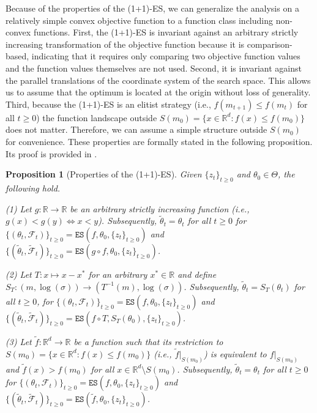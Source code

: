\documentclass[journal]{IEEEtran}
\providecommand{\R}{\mathbb{R}} %
\renewcommand{\geq}{\geqslant} %
\renewcommand{\leq}{\leqslant} %
\newtheorem{proposition}[theorem]{Proposition}
\theoremstyle{definition}
\begin{document}
Because of the properties of the (1+1)-ES, we can generalize the analysis on a relatively simple convex objective function to a function class including non-convex functions.
First, the (1+1)-ES is invariant against an arbitrary strictly increasing transformation of the objective function because it is comparison-based, indicating that it requires only comparing two objective function values and the function values themselves are not used. 
Second, it is invariant against the parallel translations of the coordinate system of the search space. This allows us to assume that the optimum is located at the origin without loss of generality.
Third, because the (1+1)-ES is an elitist strategy (i.e., $f(m_{t+1}) \leq f(m_t)$ for all $t \geq 0$) the function landscape outside $S(m_0) = \{x \in \R^d : f(x) \leq f(m_0)\}$ does not matter. 
Therefore, we can assume a simple structure outside $S(m_0)$ for convenience.
These properties are formally stated in the following proposition. 
Its proof is provided in .


\begin{proposition}[Properties of the (1+1)-ES]\label{prop:invariance}
Given $\{z_t\}_{t \geq 0}$ and $\theta_0 \in \Theta$, the following hold.

(1) Let $g:\R \to \R$ be an arbitrary strictly increasing function (i.e., $g(x) < g(y) \Leftrightarrow x < y$). Subsequently, $\tilde{\theta}_t = \theta_t$ for all $t \geq 0$ for $\{(\theta_t, \mathcal{F}_{t})\}_{t\geq 0} = \texttt{ES}(f, \theta_0, \{z_t\}_{t \geq 0})$ and $\{(\tilde{\theta}_t, \tilde{\mathcal{F}}_{t})\}_{t\geq 0} = \texttt{ES}(g \circ f, \theta_0, \{z_t\}_{t \geq 0})$.

(2) Let $T: x \mapsto x - x^*$ for an arbitrary $x^* \in \R$ and define $S_T: (m, \log(\sigma)) \to (T^{-1}(m), \log(\sigma))$. Subsequently, $\tilde{\theta}_t = S_T(\theta_t)$ for all $t \geq 0$,
for $\{(\theta_t, \mathcal{F}_{t})\}_{t\geq 0} = \texttt{ES}(f, \theta_0, \{z_t\}_{t \geq 0})$ and $\{(\tilde{\theta}_t, \tilde{\mathcal{F}}_{t})\}_{t\geq 0} = \texttt{ES}(f \circ T, S_T(\theta_0), \{z_t\}_{t \geq 0})$. 

(3) Let $\tilde{f}:\R^d\to\R$ be a function such that its restriction to $S(m_0) = \{x \in \R^d : f(x) \leq f(m_0)\}$ (i.e., $\tilde{f}\rvert_{S(m_0)}$) is equivalent to $f\rvert_{S(m_0)}$ and $\tilde{f}(x) > f(m_0)$ for all $x \in \R^d\setminus S(m_0)$. Subsequently, $\tilde{\theta}_t = \theta_t$ for all $t \geq 0$ for $\{(\theta_t, \mathcal{F}_{t})\}_{t\geq 0} = \texttt{ES}(f, \theta_0, \{z_t\}_{t \geq 0})$ and $\{(\tilde{\theta}_t, \tilde{\mathcal{F}}_{t})\}_{t\geq 0} = \texttt{ES}(\tilde{f}, \theta_0, \{z_t\}_{t \geq 0})$.
\end{proposition}
\end{document}
